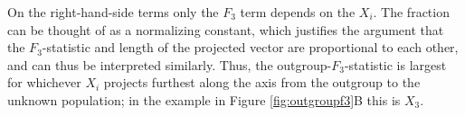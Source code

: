 \documentclass[12pt,fullpage, a4paper]{article}
\begin{document}
On the right-hand-side terms only the $F_3$ term depends on the $X_i$. The fraction can be thought of as a normalizing constant,  which justifies the argument that the $F_3$-statistic and length of the projected vector are proportional to each other, and can thus be interpreted similarly. Thus, the outgroup-$F_3$-statistic is largest for whichever $X_i$ projects furthest along the axis from the outgroup to the unknown population; in the example in Figure \ref{fig:outgroupf3}B this is $X_3$.




 
 
\end{document}
